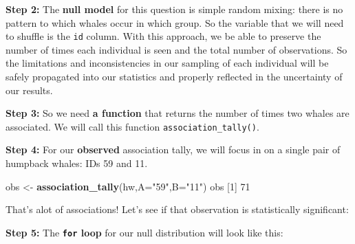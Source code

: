 \documentclass[
]{book}
\newenvironment{Shaded}{\begin{snugshade}}{\end{snugshade}}
\newcommand{\ControlFlowTok}[1]{\textcolor[rgb]{0.13,0.29,0.53}{\textbf{#1}}}
\newcommand{\DataTypeTok}[1]{\textcolor[rgb]{0.13,0.29,0.53}{#1}}
\newcommand{\DecValTok}[1]{\textcolor[rgb]{0.00,0.00,0.81}{#1}}
\newcommand{\KeywordTok}[1]{\textcolor[rgb]{0.13,0.29,0.53}{\textbf{#1}}}
\newcommand{\NormalTok}[1]{#1}
\newcommand{\OperatorTok}[1]{\textcolor[rgb]{0.81,0.36,0.00}{\textbf{#1}}}
\newcommand{\StringTok}[1]{\textcolor[rgb]{0.31,0.60,0.02}{#1}}
\begin{document}
\textbf{Step 2:} The \textbf{null model} for this question is simple random mixing: there is no pattern to which whales occur in which group. So the variable that we will need to shuffle is the \texttt{id} column. With this approach, we be able to preserve the number of times each individual is seen and the total number of observations. So the limitations and inconsistencies in our sampling of each individual will be safely propagated into our statistics and properly reflected in the uncertainty of our results.

\textbf{Step 3:} So we need \textbf{a function} that returns the number of times two whales are associated. We will call this function \texttt{association\_tally()}.

\begin{Shaded}
\end{Shaded}

\textbf{Step 4:} For our \textbf{observed} association tally, we will focus in on a single pair of humpback whales: IDs 59 and 11.

\begin{Shaded}
\begin{Highlighting}[]
\NormalTok{obs <-}\StringTok{ }\KeywordTok{association_tally}\NormalTok{(hw,}\DataTypeTok{A=}\StringTok{"59"}\NormalTok{,}\DataTypeTok{B=}\StringTok{"11"}\NormalTok{)}
\NormalTok{obs}
\NormalTok{[}\DecValTok{1}\NormalTok{] }\DecValTok{71}
\end{Highlighting}
\end{Shaded}

That's alot of associations! Let's see if that observation is statistically significant:

\textbf{Step 5:} The \textbf{\texttt{for} loop} for our null distribution will look like this:
\end{document}
